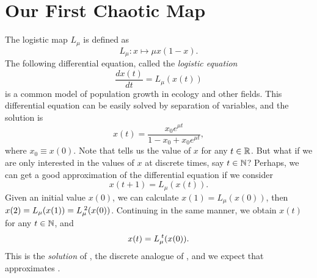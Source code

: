 \documentclass[10pt,twoside,draft]{book}
\begin{document}
\section{Our First Chaotic Map}
The logistic map $L_\mu$ is defined as 
\begin{equation*}
  L_{\mu}: x \mapsto \mu x(1-x).
\end{equation*}
The following differential equation, called the \textit{logistic equation}
\begin{equation}
  \frac{dx(t)}{dt} = L_{\mu}(x(t))
  \label{eqn:lde}
\end{equation}
is a common model of population growth in ecology and other fields.
This differential equation can be easily solved by separation of variables, and the solution is
\begin{equation}
  x(t) = \frac{x_0 e^{\mu t}}{1 - x_0 + x_0 e^{\mu t}},
  \label{eqn:ldesoln}
\end{equation}
where $x_0 \equiv x(0)$.
Note that  tells us the value of $x$ for any $t \in \mathbb{R}$.
But what if we are only interested in the values of $x$ at discrete times, say $t \in \mathbb{N}$?
Perhaps, we can get a good approximation of the differential equation if we consider
\begin{equation}
  x(t + 1) = L_{\mu}(x(t)).
  \label{eqn:logistic}
\end{equation}
Given an initial value $x(0)$, we can calculate $x(1) = L_\mu(x(0))$, then $x(2) = L_\mu(x(1)) = L_\mu^{\;2}(x(0))$.
Continuing in the same manner, we obtain $x(t)$ for any $t \in \mathbb{N}$, and 
\begin{equation}
  x(t) = L_\mu^{\;t}(x(0)).
  \label{eqn:logisticsoln}
\end{equation}
This is the \textit{solution} of , the discrete analogue of , and we expect that  approximates .
\end{document}
